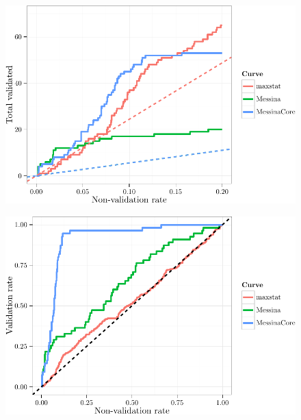 \documentclass[dissertation.tex]{subfiles}
\begin{document}
\begin{figure}
\centering
\includegraphics[width=.7\linewidth]{analysis/messina/figure/07-E3-E3-val-detcurves-1}
\caption[]{}\label{fig:mess-val-detabs}
\end{figure}

\begin{figure}
\centering
\includegraphics[width=.7\linewidth]{analysis/messina/figure/07-E3-E3-val-detcurves-2}
\caption[]{}\label{fig:mess-val-detrel}
\end{figure}
\end{document}
